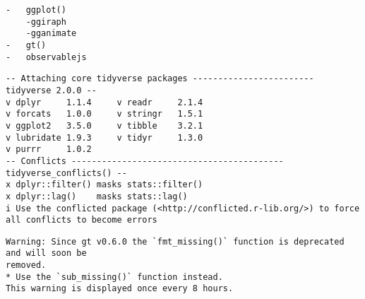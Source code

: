 \documentclass[
  letterpaper,
  DIV=11,
  numbers=noendperiod]{scrreprt}
\begin{document}
\begin{verbatim}
-   ggplot()
    -ggiraph
    -gganimate
-   gt()
-   observablejs
\end{verbatim}

\begin{verbatim}
-- Attaching core tidyverse packages ------------------------ tidyverse 2.0.0 --
v dplyr     1.1.4     v readr     2.1.4
v forcats   1.0.0     v stringr   1.5.1
v ggplot2   3.5.0     v tibble    3.2.1
v lubridate 1.9.3     v tidyr     1.3.0
v purrr     1.0.2     
-- Conflicts ------------------------------------------ tidyverse_conflicts() --
x dplyr::filter() masks stats::filter()
x dplyr::lag()    masks stats::lag()
i Use the conflicted package (<http://conflicted.r-lib.org/>) to force all conflicts to become errors
\end{verbatim}

\begin{verbatim}
Warning: Since gt v0.6.0 the `fmt_missing()` function is deprecated and will soon be
removed.
* Use the `sub_missing()` function instead.
This warning is displayed once every 8 hours.
\end{verbatim}
\end{document}
